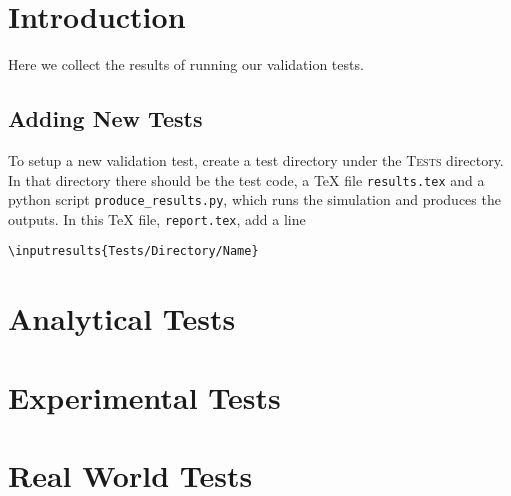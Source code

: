 \documentclass[11pt,a4paper]{report}
\begin{document}
 

\chapter{Introduction}

Here we collect the results of running our validation tests. 

\section{Adding New Tests}
To setup a new validation test, create a test directory under the
\textsc{Tests} directory. In that directory there should be the test code, a
\TeX{} file \texttt{results.tex} and a python script
\texttt{produce\_results.py}, which runs the simulation and produces the
outputs. In this \TeX{} file, \texttt{report.tex}, add a line
\begin{verbatim}
\inputresults{Tests/Directory/Name}
\end{verbatim}

\chapter{Analytical Tests}



\chapter{Experimental Tests}


\chapter{Real World Tests}

\end{document}
